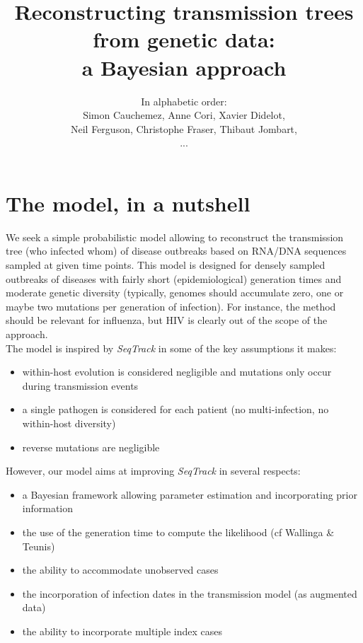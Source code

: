 \documentclass[10pt]{article}
\author{In alphabetic order: \\Simon Cauchemez, Anne Cori, Xavier Didelot, \\Neil Ferguson, Christophe Fraser, Thibaut Jombart,\\...}
\title{Reconstructing transmission trees from genetic data: \\a Bayesian approach}
\begin{document}
\maketitle

\section*{The model, in a nutshell}
We seek a simple probabilistic model allowing to reconstruct the transmission tree (who infected whom) of disease outbreaks based on RNA/DNA sequences sampled at given time points.
This model is designed for densely sampled outbreaks of diseases with fairly short (epidemiological) generation times and moderate genetic diversity (typically, genomes should accumulate zero, one or maybe two mutations per generation of infection).
For instance, the method should be relevant for influenza, but HIV is clearly out of the scope of the approach.
\\

The model is inspired by \textit{SeqTrack} in some of the key assumptions it makes: 
\begin{itemize}
\item within-host evolution is considered negligible and mutations only occur during transmission events
\item a single pathogen is considered for each patient (no multi-infection, no within-host diversity)
\item reverse mutations are negligible
\end{itemize}

However, our model aims at improving \textit{SeqTrack} in several respects:
\begin{itemize}
\item a Bayesian framework allowing parameter estimation and incorporating prior information
\item the use of the generation time to compute the likelihood (cf Wallinga \& Teunis)
\item the ability to accommodate unobserved cases
\item the incorporation of infection dates in the transmission model (as augmented data)
\item the ability to incorporate multiple index cases
\end{itemize}
\end{document}
